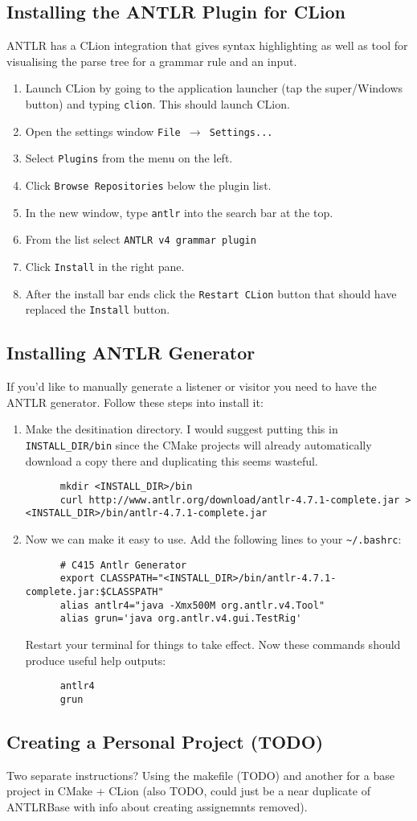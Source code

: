 \documentclass[../setup.tex]{subfiles}
\begin{document}
\subsection{Installing the ANTLR Plugin for CLion}
ANTLR has a CLion integration that gives syntax highlighting as well as tool for visualising the
parse tree for a grammar rule and an input.
\begin{enumerate}
	\item
    Launch CLion by going to the application launcher (tap the super/Windows button) and typing
    \lstinline{clion}. This should launch CLion.
	\item
    Open the settings window \texttt{File $\rightarrow$ Settings...}
  \item
    Select \texttt{Plugins} from the menu on the left.
	\item
    Click \texttt{Browse Repositories} below the plugin list.
  \item
    In the new window, type \texttt{antlr} into the search bar at the top.
	\item
    From the list select \lstinline{ANTLR v4 grammar plugin}
  \item
    Click \texttt{Install} in the right pane.
	\item
    After the install bar ends click the \texttt{Restart CLion} button that should have replaced
    the \texttt{Install} button.
\end{enumerate}

\subsection{Installing ANTLR Generator}
If you'd like to manually generate a listener or visitor you need to have the ANTLR generator.
Follow these steps into install it:
\begin{enumerate}
  \item
    Make the desitination directory. I would suggest putting this in \lstinline{INSTALL_DIR/bin}
    since the CMake projects will already automatically download a copy there and duplicating
    this seems wasteful.
    \begin{lstlisting}
      mkdir <INSTALL_DIR>/bin
      curl http://www.antlr.org/download/antlr-4.7.1-complete.jar > <INSTALL_DIR>/bin/antlr-4.7.1-complete.jar
    \end{lstlisting}
  \item
    Now we can make it easy to use. Add the following lines to your \lstinline{~/.bashrc}:
    \begin{lstlisting}
      # C415 Antlr Generator
      export CLASSPATH="<INSTALL_DIR>/bin/antlr-4.7.1-complete.jar:$CLASSPATH"
      alias antlr4="java -Xmx500M org.antlr.v4.Tool"
      alias grun='java org.antlr.v4.gui.TestRig'
    \end{lstlisting}
    Restart your terminal for things to take effect. Now these commands should produce useful help
    outputs:
    \begin{lstlisting}
      antlr4
      grun
    \end{lstlisting}
\end{enumerate}

\subsection{Creating a Personal Project (TODO)}
Two separate instructions? Using the makefile (TODO) and another for a base project in CMake +
CLion (also TODO, could just be a near duplicate of ANTLRBase with info about creating assignemnts
removed).
\end{document}
